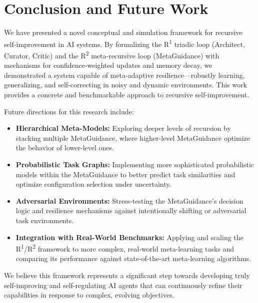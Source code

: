 \documentclass{article}
\begin{document}
\section{Conclusion and Future Work}
We have presented a novel conceptual and simulation framework for recursive self-improvement in AI systems. By formalizing the R\textsuperscript{1} triadic loop (Architect, Curator, Critic) and the R\textsuperscript{2} meta-recursive loop (MetaGuidance) with mechanisms for confidence-weighted updates and memory decay, we demonstrated a system capable of meta-adaptive resilience—robustly learning, generalizing, and self-correcting in noisy and dynamic environments. This work provides a concrete and benchmarkable approach to recursive self-improvement.

Future directions for this research include:
\begin{itemize}
    \item \textbf{Hierarchical Meta-Models:} Exploring deeper levels of recursion by stacking multiple MetaGuidance, where higher-level MetaGuidance optimize the behavior of lower-level ones.
    \item \textbf{Probabilistic Task Graphs:} Implementing more sophisticated probabilistic models within the MetaGuidance to better predict task similarities and optimize configuration selection under uncertainty.
    \item \textbf{Adversarial Environments:} Stress-testing the MetaGuidance's decision logic and resilience mechanisms against intentionally shifting or adversarial task environments.
    \item \textbf{Integration with Real-World Benchmarks:} Applying and scaling the R\textsuperscript{1}/R\textsuperscript{2} framework to more complex, real-world meta-learning tasks and comparing its performance against state-of-the-art meta-learning algorithms.
\end{itemize}
We believe this framework represents a significant step towards developing truly self-improving and self-regulating AI agents that can continuously refine their capabilities in response to complex, evolving objectives.

\end{document}
